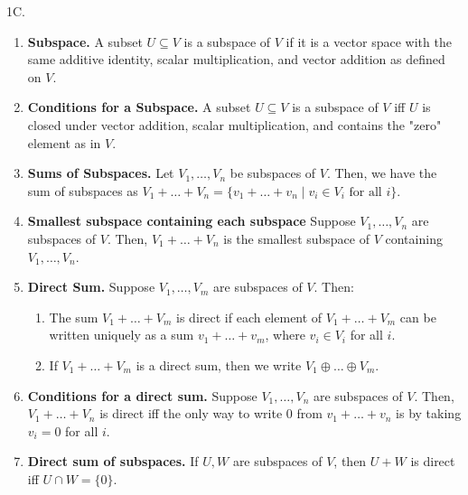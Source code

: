 \documentclass[12pt]{article}
\theoremstyle{definition}
\theoremstyle{named}
\begin{document}
1C. 
\begin{enumerate}
	\item \textbf{Subspace. } A subset $U \subseteq V$ is a subspace of $V$ if it is a vector space with the same additive identity, scalar multiplication, and vector addition as defined on $V$. 
	\item \textbf{Conditions for a Subspace. } A subset $U \subseteq V$ is a subspace of $V$ iff $U$ is closed under vector addition, scalar multiplication, and contains the "zero" element as in $V$. 
	\item \textbf{Sums of Subspaces. } Let $V_1,\dots,V_n$ be subspaces of $V$. Then, we have the sum of subspaces as $V_1 + \dots + V_n = \{v_1 + \dots + v_n \mid v_i \in V_i \textrm{ for all } i\}$. 
	\item \textbf{Smallest subspace containing each subspace} Suppose $V_1,\dots,V_n$ are subspaces of $V$. Then, $V_1 + \dots + V_n$ is the smallest subspace of $V$ containing $V_1,\dots,V_n$. 
	\item \textbf{Direct Sum. } Suppose $V_1,\dots,V_m$ are subspaces of $V$. Then: 
	\begin{enumerate}
		\item The sum $V_1 + \dots + V_m$ is direct if each element of $V_1 + \dots + V_m$ can be written uniquely as a sum $v_1 + \dots + v_m$, where $v_i \in V_i$ for all $i$. 
		\item If $V_1 + \dots + V_m$ is a direct sum, then we write $V_1 \oplus \dots \oplus V_m$. 
	\end{enumerate}
	\item \textbf{Conditions for a direct sum. } Suppose $V_1,\dots,V_n$ are subspaces of $V$. Then, $V_1 + \dots + V_n$ is direct iff the only way to write 0 from $v_1 + \dots + v_n$ is by taking $v_i=0$ for all $i$. 
	\item \textbf{Direct sum of subspaces. } If $U,W$ are subspaces of $V$, then $U + W$ is direct iff $U \cap W = \{0\}$. 	
\end{enumerate}
\end{document}
